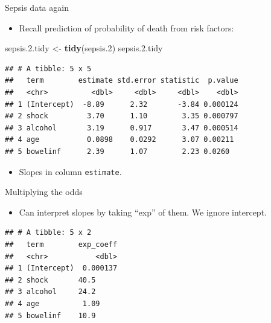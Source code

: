 \documentclass[
  ignorenonframetext,
]{beamer}
\newenvironment{Shaded}{\begin{snugshade}}{\end{snugshade}}
\newcommand{\DataTypeTok}[1]{\textcolor[rgb]{0.13,0.29,0.53}{#1}}
\newcommand{\FloatTok}[1]{\textcolor[rgb]{0.00,0.00,0.81}{#1}}
\newcommand{\KeywordTok}[1]{\textcolor[rgb]{0.13,0.29,0.53}{\textbf{#1}}}
\newcommand{\NormalTok}[1]{#1}
\newcommand{\OperatorTok}[1]{\textcolor[rgb]{0.81,0.36,0.00}{\textbf{#1}}}
\newcommand{\StringTok}[1]{\textcolor[rgb]{0.31,0.60,0.02}{#1}}
\providecommand{\tightlist}{%
  \setlength{\itemsep}{0pt}\setlength{\parskip}{0pt}}
\begin{document}
\begin{frame}[fragile]{Sepsis data again}
\protect\hypertarget{sepsis-data-again}{}

\begin{itemize}
\tightlist
\item
  Recall prediction of probability of death from risk factors:
\end{itemize}

\begin{Shaded}
\begin{Highlighting}[]
\NormalTok{sepsis.}\FloatTok{2.}\NormalTok{tidy <-}\StringTok{ }\KeywordTok{tidy}\NormalTok{(sepsis}\FloatTok{.2}\NormalTok{)}
\NormalTok{sepsis.}\FloatTok{2.}\NormalTok{tidy}
\end{Highlighting}
\end{Shaded}

\begin{verbatim}
## # A tibble: 5 x 5
##   term        estimate std.error statistic  p.value
##   <chr>          <dbl>     <dbl>     <dbl>    <dbl>
## 1 (Intercept)  -8.89      2.32       -3.84 0.000124
## 2 shock         3.70      1.10        3.35 0.000797
## 3 alcohol       3.19      0.917       3.47 0.000514
## 4 age           0.0898    0.0292      3.07 0.00211 
## 5 bowelinf      2.39      1.07        2.23 0.0260
\end{verbatim}

\begin{itemize}
\tightlist
\item
  Slopes in column \texttt{estimate}.
\end{itemize}

\end{frame}

\begin{frame}[fragile]{Multiplying the odds}
\protect\hypertarget{multiplying-the-odds}{}

\begin{itemize}
\tightlist
\item
  Can interpret slopes by taking ``exp'' of them. We ignore intercept.
\end{itemize}

\begin{Shaded}
\end{Shaded}

\begin{verbatim}
## # A tibble: 5 x 2
##   term        exp_coeff
##   <chr>           <dbl>
## 1 (Intercept)  0.000137
## 2 shock       40.5     
## 3 alcohol     24.2     
## 4 age          1.09    
## 5 bowelinf    10.9
\end{verbatim}

\end{frame}
\end{document}
